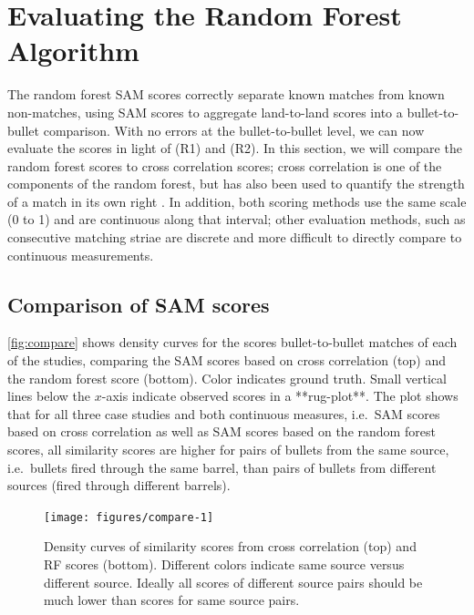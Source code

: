 \documentclass[doubleblind]{elsarticle}\usepackage[]{graphicx}\usepackage[]{color}
\newenvironment{knitrout}{}{} %
\begin{document}
\section{Evaluating the Random Forest Algorithm}
The random forest SAM scores correctly separate known matches from known non-matches, using SAM scores to aggregate land-to-land scores into a bullet-to-bullet comparison. With no errors at the bullet-to-bullet level, we can now evaluate the scores in light of (R1) and (R2). In this section, we will compare the random forest scores to cross correlation scores; cross correlation is one of the components of the random forest, but has also been used to quantify the strength of a match in its own right \citep{chuPilotStudyAutomated2010}. In addition, both scoring methods use the same scale (0 to 1) and are continuous along that interval; other evaluation methods, such as consecutive matching striae are discrete and more difficult to directly compare to continuous measurements.

\subsection{Comparison of SAM scores}
\autoref{fig:compare} shows density curves for the scores bullet-to-bullet matches of each of the studies, comparing the SAM scores based on cross correlation (top) and the random forest score (bottom). Color indicates ground truth. Small vertical lines below the $x$-axis indicate observed scores in a **rug-plot**. The plot shows that for all three case studies and both continuous measures, i.e.\ SAM scores based on cross correlation as well as SAM scores based on the random forest scores, all similarity scores are higher for pairs of bullets from the same source, i.e.\ bullets fired through the same barrel, than pairs of bullets from different sources (fired through different barrels). 
 
\begin{knitrout}
\color{fgcolor}\begin{figure}

{\centering \texttt{[image: figures/compare-1]} 

}

\caption[Density curves of similarity scores from cross correlation (top) and RF scores (bottom)]{Density curves of similarity scores from cross correlation (top) and RF scores (bottom). Different colors indicate same source versus different source. Ideally all scores of different source pairs should be much lower than scores for same source pairs.}\label{fig:compare}
\end{figure}


\end{knitrout}
\end{document}
